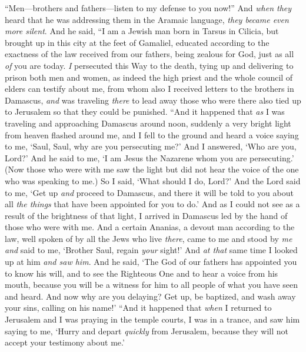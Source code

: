 \begin{biblechapter} %
\verse “Men—brothers and fathers—listen to my defense to you now!”
\verse And \textit{when they} heard that he was addressing them in the Aramaic language, \textit{they became even more silent}. And he said,
\verse “I am a Jewish man born in Tarsus in Cilicia, but brought up in this city at the feet of Gamaliel, educated according to the exactness of the law received from our fathers, being zealous for God, just as all \textit{of} you are today.
\verse \textit{I} persecuted this Way to the death, tying up and delivering to prison both men and women,
\verse as indeed the high priest and the whole council of elders can testify about me, from whom also I received letters to the brothers in Damascus, \textit{and} was traveling \textit{there} to lead away those who were there also tied up to Jerusalem so that they could be punished.
 “And it happened that \textit{as} I was traveling and approaching Damascus around noon, suddenly a very bright light from heaven flashed around me,
\verse and I fell to the ground and heard a voice saying to me, ‘Saul, Saul, why are you persecuting me?’
\verse And I answered, ‘Who are you, Lord?’ And he said to me, ‘I am Jesus the Nazarene whom you are persecuting.’
\verse (Now those who were with me saw the light but did not hear the voice of the one who was speaking to me.)
\verse So I said, ‘What should I do, Lord?’ And the Lord said to me, ‘Get up \textit{and} proceed to Damascus, and there it will be told to you about all \textit{the things} that have been appointed for you to do.’
\verse And as I could not see as a result of the brightness of that light, I arrived in Damascus led by the hand of those who were with me.
\verse And a certain Ananias, a devout man according to the law, well spoken of by all the Jews who live \textit{there},
\verse came to me and stood by \textit{me} \textit{and} said to me, ‘Brother Saul, regain \textit{your} sight!’ And \textit{at that} same time I looked up at him \textit{and saw him}.
\verse And he said, ‘The God of our fathers has appointed you to know his will, and to see the Righteous One and to hear a voice from his mouth,
\verse because you will be a witness for him to all people of what you have seen and heard.
\verse And now why are you delaying? Get up, be baptized, and wash away your sins, calling on his name!’
\verse “And it happened that \textit{when} I returned to Jerusalem and I was praying in the temple courts, I was in a trance,
\verse and saw him saying to me, ‘Hurry and depart \textit{quickly} from Jerusalem, because they will not accept your testimony about me.’

\end{biblechapter}

